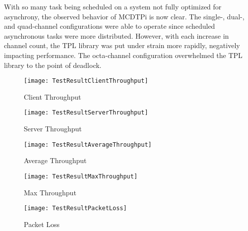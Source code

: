 With so many task being scheduled on a system not fully optimized for asynchrony, the observed behavior of MCDTPi is now clear. The single-, dual-, and quad-channel configurations were able to operate since scheduled asynchronous tasks were more distributed. However, with each increase in channel count, the TPL library was put under strain more rapidly, negatively impacting performance. The octa-channel configuration overwhelmed the TPL library to the point of deadlock.


\newpage

\begin{figure}[ht]
\centering
\texttt{[image: TestResultClientThroughput]}
\caption{Client Throughput}
\label{fig:tr-ct}
\end{figure}

\begin{figure}[ht]
\centering
\texttt{[image: TestResultServerThroughput]}
\caption{Server Throughput}
\label{fig:tr-st}
\end{figure}

\begin{figure}[ht]
\centering
\texttt{[image: TestResultAverageThroughput]}
\caption{Average Throughput}
\label{fig:tr-at}
\end{figure}

\begin{figure}[ht]
\centering
\texttt{[image: TestResultMaxThroughput]}
\caption{Max Throughput}
\label{fig:tr-mt}
\end{figure}

\begin{figure}[ht]
\centering
\texttt{[image: TestResultPacketLoss]}
\caption{Packet Loss}
\label{fig:tr-pl}
\end{figure}